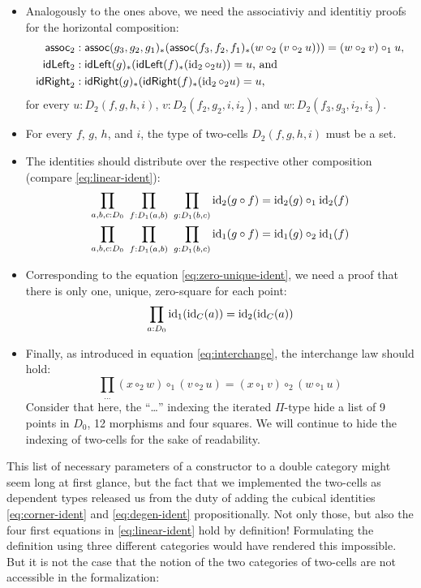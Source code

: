 \begin{defn}
\begin{itemize}
\item Analogously to the ones above, we need the associativiy and identitiy proofs
for the horizontal composition:
\begin{align*}
\assoch &: \assoc(g_3,g_2,g_1)_*(\assoc(f_3,f_2,f_1)_*(w \circ_2 (v \circ_2 u))) =
	(w \circ_2 v) \circ_1 u \text{,} \\ %
\idLefth &: \idLeft(g)_*(\idLeft(f)_*(\id_2 \circ_2 u)) = u \text{, and } \\
\idRighth &: \idRight(g)_*(\idRight(f)_*(\id_2 \circ_2 u) = u \text{,}
\end{align*}
for every $u : D_2(f,g,h,i)$, $v : D_2(f_2,g_2,i,i_2)$, and $w : D_2(f_3,g_3,i_2,i_3)$.
\item For every $f$, $g$, $h$, and $i$, the type of two-cells $D_2(f,g,h,i)$ must
be a set.
\item The identities should distribute over the respective other composition
(compare \ref{eq:linear-ident}):
\begin{align*}
\prod_{a,b,c : D_0} ~ \prod_{f : D_1(a,b)} ~ \prod_{g : D_1(b,c)}
	\operatorname{id}_2 (g \circ f) = \operatorname{id}_2(g) \circ_1 \operatorname{id}_2(f) \\
\prod_{a,b,c : D_0} ~ \prod_{f : D_1(a,b)} ~ \prod_{g : D_1(b,c)}
	\operatorname{id}_1 (g \circ f) = \operatorname{id}_1(g) \circ_2 \operatorname{id}_1(f)
\end{align*}
\item Corresponding to the equation \ref{eq:zero-unique-ident}, we need a proof
that there is only one, unique, zero-square for each point:
\begin{equation*}
\prod_{a : D_0} \operatorname{id}_1(\operatorname{id}_C(a)) = \operatorname{id}_2(\operatorname{id}_C(a))
\end{equation*}
\item Finally, as introduced in equation \ref{eq:interchange}, the interchange
law should hold:
\begin{equation*}
\prod_{\ldots} (x \circ_2 w) \circ_1 (v \circ_2 u) = (x \circ_1 v) \circ_2 (w \circ_1 u)
\end{equation*}
Consider that here, the ``\ldots'' indexing the iterated $\Pi$-type hide a list
of 9 points in $D_0$, 12 morphisms and four squares.
We will continue to hide the indexing of two-cells for the sake of readability.
\end{itemize}
\end{defn}

This list of necessary parameters of a constructor to a double category might seem long at first
glance, but the fact that we implemented the two-cells as dependent types
released us from the duty of adding the cubical identities \ref{eq:corner-ident}
and \ref{eq:degen-ident} propositionally.
Not only those, but also the four first equations in \ref{eq:linear-ident} hold
by definition!
Formulating the definition using three different categories would have rendered
this impossible.
But it is not the case that the notion of the two categories of two-cells are not
accessible in the formalization:

